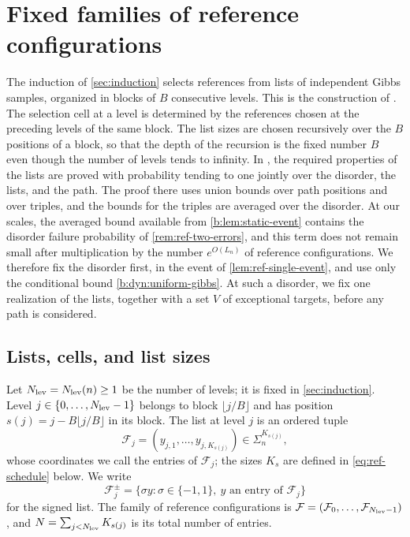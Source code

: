 \section{Fixed families of reference configurations}\label{sec:ref-families}

The induction of \cref{sec:induction} selects references from lists of
independent Gibbs samples, organized in blocks of $B$ consecutive levels.
This is the construction of \cite[Section~8.3]{oai-barriers}. The selection
cell at a level is determined by the references chosen at the preceding
levels of the same block. The list sizes are chosen recursively over the $B$
positions of a block, so that the depth of the recursion is the fixed number
$B$ even though the number of levels tends to infinity. In
\cite[Section~8.3]{oai-barriers}, the required properties of the lists are
proved with probability tending to one jointly over the disorder, the lists,
and the path. The proof there uses union bounds over path positions and over
triples, and the bounds for the triples are averaged over the disorder. At
our scales, the
averaged bound available from \cref{b:lem:static-event} contains the disorder
failure probability of \cref{rem:ref-two-errors}, and this term does not
remain small after multiplication by the number $e^{O(L_n)}$ of reference
configurations. We therefore fix the
disorder first, in the event of \cref{lem:ref-single-event}, and use only
the conditional bound \eqref{b:dyn:uniform-gibbs}. At such a disorder, we fix
one realization of the lists, together with a set $V$ of exceptional
targets, before any path is considered.

\subsection{Lists, cells, and list sizes}

Let $N_{\rm lev}=N_{\rm lev}(n)\ge1$ be the number of levels; it is fixed in
\cref{sec:induction}. Level $j\in\{0,\ldots,N_{\rm lev}-1\}$ belongs to block
$\lfloor j/B\rfloor$ and has position $s(j)=j-B\lfloor j/B\rfloor$ in its
block. The list at level $j$ is an ordered tuple
\[
 \mathcal F_j=(y_{j,1},\ldots,y_{j,K_{s(j)}})\in\Sigma_n^{K_{s(j)}},
\]
whose coordinates we call the entries of $\mathcal F_j$; the sizes $K_s$ are
defined in \eqref{eq:ref-schedule} below. We write
\[
 \mathcal F_j^\pm=\bigl\{\sigma y:\sigma\in\{-1,1\},\ y\text{ an entry of }
   \mathcal F_j\bigr\}
\]
for the signed list. The family of reference configurations is
$\mathcal F=(\mathcal F_0,\ldots,\mathcal F_{N_{\rm lev}-1})$, and
$N=\sum_{j<N_{\rm lev}}K_{s(j)}$ is its total number of entries.

